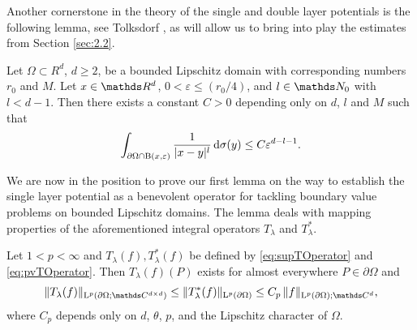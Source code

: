 Another cornerstone in the theory of the single and double layer potentials is the following lemma, see Tolksdorf \cite[Lem. 4.3.2]{tolksdorf}, as will allow us to bring into play the estimates from Section \ref{sec:2.2}.

\begin{lem}
  \label{lem:central}
  Let $\Omega \subset R^d$, $d \geq 2$, be a bounded Lipschitz domain with corresponding numbers $r_0$ and $M$.
  Let $x \in \R^d$, $0 < \varepsilon \leq (r_0/4)$, and $l \in \N_0$ with $l < d - 1$.
  Then there exists a constant $C > 0$ depending only on $d$, $l$ and $M$ such that
  \begin{align*}
    \int_{\partial\Omega \cap \mathrm{B}(x, \varepsilon)} \frac{1}{|x - y|^l} \, {\operatorname{d}\!{\sigma}}(y) \leq C \varepsilon^{d - l - 1}.
  \end{align*}
\end{lem}

We are now in the position to prove our first lemma on the way to establish the single layer potential as a benevolent operator for tackling boundary value problems on bounded Lipschitz domains. The lemma deals with mapping properties of the aforementioned integral operators $T_\lambda$ and $T_\lambda^*$.

\begin{lem}
  \label{lem:lpBoundednessT}
  Let $1 < p < \infty$ and $T_\lambda(f), T_\lambda^*(f)$ be defined by \eqref{eq:supTOperator} and \eqref{eq:pvTOperator}.
  Then $T_\lambda(f)(P)$ exists for almost everywhere $P \in \partial\Omega$ and
  \begin{align}
    \label{eq:lpBoundednessT}
    \|T_\lambda(f) \|_{\Ell^p(\partial\Omega; \C^{d \times d})}
    \leq \|T_\lambda^*(f) \|_{\Ell^p(\partial\Omega)}
    \leq C_p \, \|f\|_{\Ell^p(\partial\Omega); \C^d},
  \end{align}
  where $C_p$ depends only on $d$, $\theta$, $p$, and the Lipschitz character of $\Omega$.
\end{lem}

